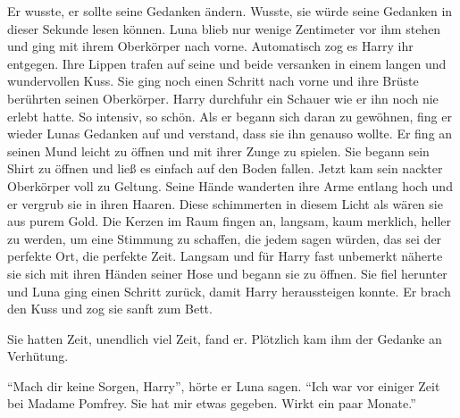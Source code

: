 \begin{abAchtzehn}
Er wusste, er sollte seine Gedanken ändern. Wusste, sie würde seine Gedanken in dieser Sekunde lesen können. Luna blieb nur wenige Zentimeter vor ihm stehen und ging mit ihrem Oberkörper nach vorne. Automatisch zog es Harry ihr entgegen. Ihre Lippen trafen auf seine und beide versanken in einem langen und wundervollen Kuss. Sie ging noch einen Schritt nach vorne und ihre Brüste berührten seinen Oberkörper. Harry durchfuhr ein Schauer wie er ihn noch nie erlebt hatte. So intensiv, so schön. Als er begann sich daran zu gewöhnen, fing er wieder Lunas Gedanken auf und verstand, dass sie ihn genauso wollte. Er fing an seinen Mund leicht zu öffnen und mit ihrer Zunge zu spielen. Sie begann sein Shirt zu öffnen und ließ es einfach auf den Boden fallen. Jetzt kam sein nackter Oberkörper voll zu Geltung. Seine Hände wanderten ihre Arme entlang hoch und er vergrub sie in ihren Haaren. Diese schimmerten in diesem Licht als wären sie aus purem Gold. Die Kerzen im Raum fingen an, langsam, kaum merklich, heller zu werden, um eine Stimmung zu schaffen, die jedem sagen würden, das sei der perfekte Ort, die perfekte Zeit. Langsam und für Harry fast unbemerkt näherte sie sich mit ihren Händen seiner Hose und begann sie zu öffnen. Sie fiel herunter und Luna ging einen Schritt zurück, damit Harry heraussteigen konnte. Er brach den Kuss und zog sie sanft zum Bett.

Sie hatten Zeit, unendlich viel Zeit, fand er. Plötzlich kam ihm der Gedanke an Verhütung.

\enquote{Mach dir keine Sorgen, Harry}, hörte er Luna sagen. \enquote{Ich war vor einiger Zeit bei Madame Pomfrey. Sie hat mir etwas gegeben. Wirkt ein paar Monate.}


\end{abAchtzehn}
